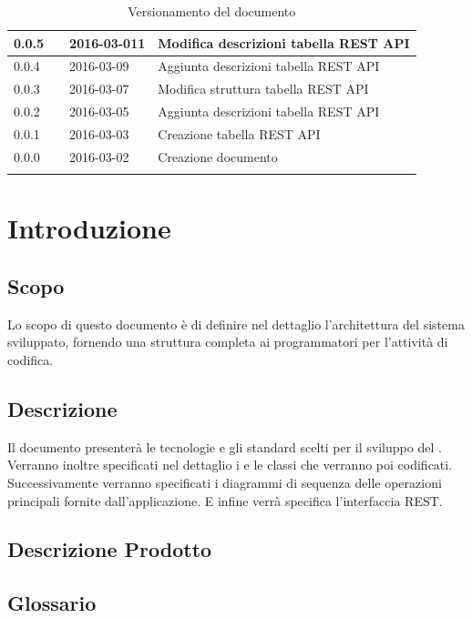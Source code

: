 \documentclass[12pt,a4paper]{article}
\begin{document}
\begin{center}
\begin{longtable}[H]{p{} p{} p{} p{}}
		\midrule
		0.0.5 & \AVE{} & 2016-03-011 & Modifica descrizioni tabella REST API \\*
		\midrule
		0.0.4 & \TP{} & 2016-03-09 &  Aggiunta descrizioni tabella REST API \\*
		\midrule
		0.0.3 & \TP{} & 2016-03-07 &  Modifica struttura tabella REST API \\*
		\midrule
		0.0.2 & \AVI{} & 2016-03-05 &  Aggiunta descrizioni tabella REST API \\*
		\midrule
		0.0.1 & \NDC{} & 2016-03-03 &  Creazione tabella REST API \\*
		\midrule
		0.0.0 & \NDC{} & 2016-03-02 &  Creazione documento \\*
		\bottomrule
		\caption{Versionamento del documento}
		\label{tabVers1} 
	\end{longtable}
\end{center}

\newpage
\tableofcontents
\newpage
\listoftables
\listoffigures
\newpage

\section{Introduzione}	\label{intro}
\subsection{Scopo}
Lo scopo di questo documento è di definire nel dettaglio l'architettura del sistema sviluppato, fornendo una struttura completa ai programmatori per l'attività di codifica.

\subsection{Descrizione}
Il documento presenterà le tecnologie e gli standard scelti per il sviluppo del . Verranno inoltre specificati nel dettaglio i  e le classi che verranno poi codificati. Successivamente verranno specificati i diagrammi di sequenza delle operazioni principali fornite dall'applicazione. E infine verrà specifica l'interfaccia REST.

\subsection{Descrizione Prodotto}
\descrizioneProdotto

\subsection{Glossario}
\glossarioPrint
\end{document}
